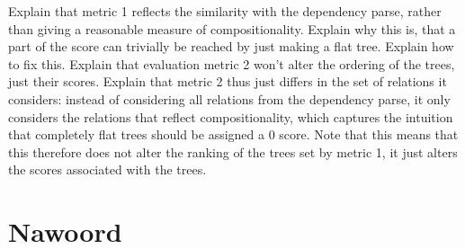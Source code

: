 \documentclass[a4paper, 11pt]{report}
\theoremstyle{definition}
\theoremstyle{plain}
\begin{document}
Explain that metric 1 reflects the similarity with the dependency parse, rather than giving a reasonable measure of compositionality. Explain why this is, that a part of the score can trivially be reached by just making a flat tree. Explain how to fix this. Explain that evaluation metric 2 won't alter the ordering of the trees, just their scores.
Explain that metric 2 thus just differs in the set of relations it considers: instead of considering all relations from the dependency parse, it only considers the relations that reflect compositionality, which captures the intuition that completely flat trees should be assigned a 0 score. Note that this means that this therefore does not alter the ranking of the trees set by metric 1, it just alters the scores associated with the trees.



\chapter{Nawoord}


















% 



\end{document}
